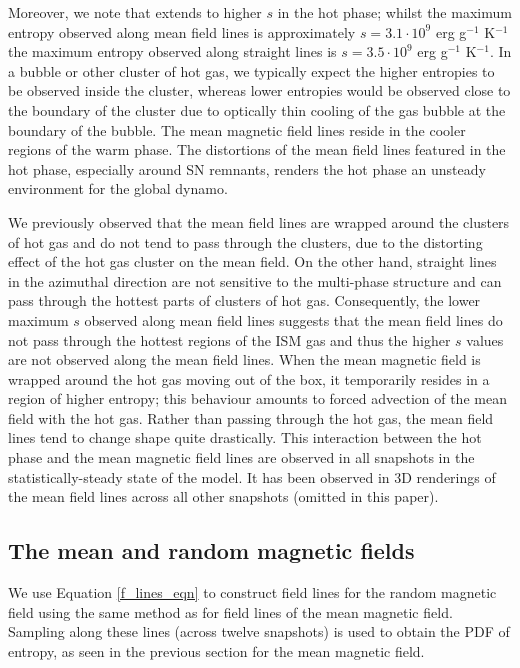 \documentclass[useAMS,usenatbib]{mn2e}
\begin{document}
Moreover, we note that \stprs extends to higher $s$ in the hot phase; whilst the maximum entropy observed along mean field lines is approximately $s = 3.1\cdot10^9$ erg g$^{-1}$ K$^{-1}$ the maximum entropy observed along straight lines is $s = 3.5\cdot10^9$ erg g$^{-1}$ K$^{-1}$. In a bubble or other cluster of hot gas, we typically expect the higher entropies to be observed inside the cluster, whereas lower entropies would be observed close to the boundary of the cluster due to optically thin cooling of the gas bubble at the boundary of the bubble.
The mean magnetic field lines reside in the cooler regions of the warm phase. The distortions of the mean field lines featured in the hot phase, especially around SN remnants, renders the hot phase an unsteady environment for the global dynamo.   

We previously observed that the mean field lines are wrapped around the clusters of hot gas and do not tend to pass through the clusters, due to the distorting effect of the hot gas cluster on the mean field. On the other hand, straight lines in the azimuthal direction are not sensitive to the multi-phase structure and can pass through the hottest parts of clusters of hot gas. Consequently, the lower maximum $s$ observed along mean field lines suggests that the mean field lines do not pass through the hottest regions of the ISM gas and thus the higher $s$ values are not observed along the mean field lines.
When the mean magnetic field is wrapped around the hot gas moving out of the box, it temporarily resides in a region of higher entropy; this behaviour amounts to forced advection of the mean field with the hot gas. Rather than passing through the hot gas, the mean field lines tend to change shape quite drastically.  
This interaction between the hot phase and the mean magnetic field lines are observed in all snapshots in the statistically-steady state of the model. It has been observed in $3$D renderings of the mean field lines across all other snapshots (omitted in this paper).
\subsection{The mean and random magnetic fields}
We use Equation \eqref{f_lines_eqn} to construct field lines for the random magnetic field using the same method as for field lines of the mean magnetic field. Sampling along these lines (across twelve snapshots) is used to obtain the PDF of entropy, as seen in the previous section for the mean magnetic field. 
\end{document}
